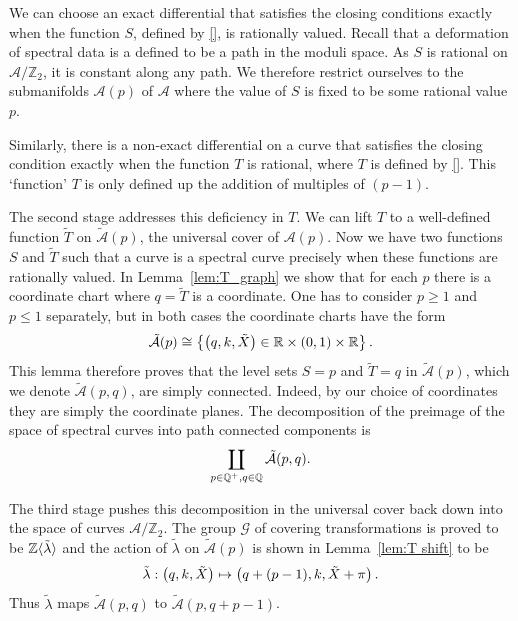 \documentclass{article}
\begin{document}
We can choose an exact differential that satisfies the closing conditions exactly when the function $S$, defined by \eqref{}, is rationally valued.
Recall that a deformation of spectral data is a defined to be a path in the moduli space.
As $S$ is rational on $\mathcal{A}/\mathbb{Z}_2$, it is constant along any path. We therefore restrict ourselves to the submanifolds $\mathcal{A}(p)$ of $\mathcal{A}$ where the value of $S$ is fixed to be some rational value $p$.

Similarly, there is a non-exact differential on a curve that satisfies the closing condition exactly when the function $T$ is rational, where $T$ is defined by \ref{}. This `function' $T$ is only defined up the addition of multiples of $(p-1)$. %

The second stage addresses this deficiency in $T$. We can lift $T$ to a well-defined function $\tilde{T}$ on $\mathcal{\tilde{A}}(p)$, the universal cover of $\mathcal{A}(p)$. Now we have two functions $S$ and $\tilde{T}$ such that a curve is a spectral curve precisely when these functions are rationally valued. In Lemma~\ref{lem:T_graph} we show that for each $p$ there is a coordinate chart where $q=\tilde{T}$ is a coordinate. One has to consider $p \geq 1$ and $p \leq 1$ separately, but in both cases the coordinate charts have the form 
\[
\mathcal{\tilde{A}}(p) \cong \left\{ \left(q,k,\tilde{X}\right) \in \mathbb{R} \times (0,1) \times \mathbb{R} \right\}.
\]
This lemma therefore proves that the level sets $S = p$ and $\tilde{T} = q$ in $\mathcal{\tilde{A}}(p)$, which we denote $\mathcal{\tilde{A}}(p,q)$, are simply connected. Indeed, by our choice of coordinates they are simply the coordinate planes. The decomposition of the preimage of the space of spectral curves into path connected components is
\[
\coprod_{p \in \mathbb{Q}^+, q\in\mathbb{Q}} \mathcal{\tilde{A}}(p,q).
\]

The third stage pushes this decomposition in the universal cover back down into the space of curves $\mathcal{A}/\mathbb{Z}_2$.
The group $\mathcal{G}$ of covering transformations is proved to be $\mathbb{Z}\langle \tilde{\lambda} \rangle$ and the action of $\tilde{\lambda}$ on $\mathcal{\tilde{A}}(p)$ is shown in Lemma~\ref{lem:T shift} to be
\[
\tilde{\lambda} : \left(q,k,\tilde{X}\right) \mapsto \left(q + (p-1),k,\tilde{X} + \pi\right).
\]
Thus $\tilde{\lambda}$ maps $\mathcal{\tilde{A}}(p,q)$ to $\mathcal{\tilde{A}}(p,q + p-1)$. 
\end{document}
